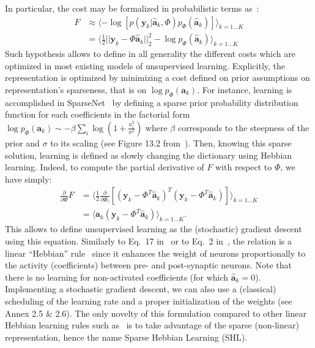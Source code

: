 \documentclass[vision,article,submit,oneauthor,pdftex]{Definitions/mdpi}
\newcommand{\coef}{\mathbf{a}} %
\newcommand{\image}{\mathbf{y}} %
\newcommand{\dico}{\Phi} %
\newcommand{\norm}[1]{|\!| #1 |\!|}
\begin{document}
In particular, the cost %
may be formalized in probabilistic terms as~\citep{Olshausen97}:
\begin{align}
F &\approx \langle - \log [ p(\image_k | \hat{\coef}_{k}, \dico ) p_\dico(\hat{\coef}_{k}) ]\rangle_{k = 1 \ldots K} \\
&= \langle \frac{1}{2} \norm{\image_k - \dico \hat{\coef}_{k}}_2^2 - \log p_\dico(\hat{\coef}_{k})\rangle_{k = 1 \ldots K} \label{eq:sparse_cost} \end{align}
Such hypothesis allows to define in all generality the different costs which are optimized in most existing models of unsupervised learning. Explicitly, the representation is optimized by minimizing a cost defined on prior assumptions on representation's sparseness, that is on $\log p_\dico( \coef_{k})$. For instance, learning is accomplished in {\sc SparseNet}~\citep{Olshausen97} by defining a sparse prior probability distribution function for each coefficients in the factorial form $\log p_\dico(\coef_{k}) \sim -\beta \sum_i \log ( 1 + \frac{a_i^2}{\sigma^2} )$ where $\beta$ corresponds to the steepness of the prior and $\sigma$ to its scaling (see Figure 13.2 from~\citep{Olshausen02}). Then, knowing this sparse solution, learning is defined as slowly changing the dictionary using Hebbian learning.
Indeed, to compute the partial derivative of $F$ with respect to $\dico$, we have simply:
\begin{align}
\frac{\partial }{\partial \dico } F &= \langle\frac{1}{2} \frac{\partial }{\partial \dico_i }[(\image_k - \dico^T \hat{\coef}_{k})^T (\image_k - \dico^T \hat{\coef}_{k})]\rangle_{k = 1 \ldots K} \\
&= \langle\hat{\coef}_{k} (\image_k - \dico^T \hat{\coef}_{k})\rangle_{k = 1 \ldots K}.
\end{align}
This allows to define unsupervised learning as the (stochastic) gradient descent using this equation. Similarly to Eq.~17 in~\citep{Olshausen97} or to Eq.~2 in~\citep{Smith06}, the relation is a linear ``Hebbian'' rule~\citep{Hebb49} since it enhances the weight of neurons proportionally to the activity (coefficients) between pre- and post-synaptic neurons. Note that there is no learning for non-activated coefficients (for which $\hat{\coef}_{k}=0$). Implementing a stochastic gradient descent, we can also use a (classical) scheduling of the learning rate and a proper initialization of the weights (see Annex 2.5 \& 2.6). The only novelty of this formulation compared to other linear Hebbian learning rules such as~\citep{Oja82} is to take advantage of the sparse (non-linear) representation, hence the name Sparse Hebbian Learning (SHL).
\end{document}

